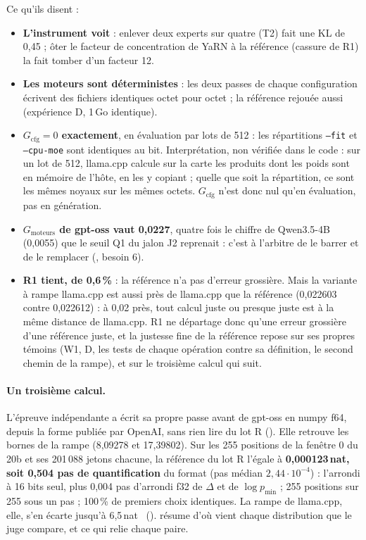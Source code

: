 Ce qu'ils disent :
\begin{itemize}
\item \textbf{L'instrument voit} : enlever deux experts sur quatre (T2) fait une KL de 0,45 ; ôter le facteur de concentration de YaRN à la référence (cassure de R1) la fait tomber d'un facteur 12.
\item \textbf{Les moteurs sont déterministes} : les deux passes de chaque configuration écrivent des fichiers identiques octet pour octet ; la référence rejouée aussi (expérience D, 1\,Go identique).
\item \textbf{$G_{\text{cfg}} = 0$ exactement}, en évaluation par lots de 512 : les répartitions \texttt{--fit} et \texttt{--cpu-moe} sont identiques au bit. Interprétation, non vérifiée dans le code : sur un lot de 512, llama.cpp calcule sur la carte les produits dont les poids sont en mémoire de l'hôte, en les y copiant ; quelle que soit la répartition, ce sont les mêmes noyaux sur les mêmes octets. $G_{\text{cfg}}$ n'est donc nul qu'en évaluation, pas en génération.
\item \textbf{$G_{\text{moteurs}}$ de gpt-oss vaut 0,0227}, quatre fois le chiffre de Qwen3.5-4B (0,0055) que le seuil Q1 du jalon J2 reprenait : c'est à l'arbitre de le barrer et de le remplacer (, besoin 6).
\item \textbf{R1 tient, de 0,6\,\%} : la référence n'a pas d'erreur grossière. Mais la variante à rampe llama.cpp est aussi près de llama.cpp que la référence (0,022603 contre 0,022612) : à 0,02 près, tout calcul juste ou presque juste est à la même distance de llama.cpp. R1 ne départage donc qu'une erreur grossière d'une référence juste, et la justesse fine de la référence repose sur ses propres témoins (W1, D, les tests de chaque opération contre sa définition, le second chemin de la rampe), et sur le troisième calcul qui suit.
\end{itemize}

\paragraph{Un troisième calcul.} L'épreuve indépendante a écrit sa propre passe avant de gpt-oss en numpy f64, depuis la forme publiée par OpenAI, sans rien lire du lot R (). Elle retrouve les bornes de la rampe (8,09278 et 17,39802). Sur les 255 positions de la fenêtre 0 du 20b et ses 201\,088 jetons chacune, la référence du lot R l'égale à \textbf{0,000123\,nat, soit 0,504 pas de quantification} du format (pas médian $2{,}44\cdot10^{-4}$) : l'arrondi à 16 bits seul, plus 0,004 pas d'arrondi f32 de $\Delta$ et de $\log p_{\min}$ ; 255 positions sur 255 sous un pas ; 100\,\% de premiers choix identiques. La rampe de llama.cpp, elle, s'en écarte jusqu'à 6,5\,nat \mes~().  résume d'où vient chaque distribution que le juge compare, et ce qui relie chaque paire.

